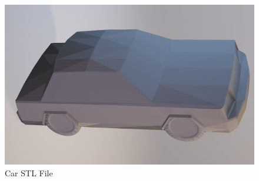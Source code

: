 \begin{figure}[H]
    \centering
    \includegraphics[width=\textwidth]{Car-STL.png}
    \caption{Car STL File}
    \label{Car-STL}
\end{figure}
